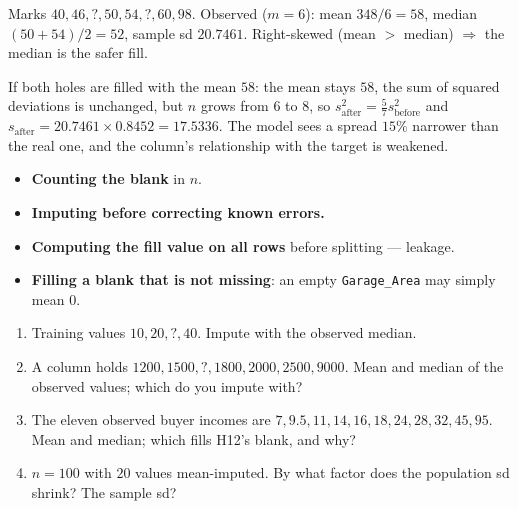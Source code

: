 \documentclass[11pt]{article}
\begin{document}
\begin{worked}
Marks $40, 46, ?, 50, 54, ?, 60, 98$. Observed ($m = 6$): mean $348/6 = 58$,
median $(50 + 54)/2 = 52$, sample sd $20.7461$. Right-skewed (mean $>$
median) $\Rightarrow$ the median is the safer fill.

If both holes are filled with the mean $58$: the mean stays $58$, the sum of
squared deviations is unchanged, but $n$ grows from $6$ to $8$, so
$s^2_{\text{after}} = \tfrac57 s^2_{\text{before}}$ and
$s_{\text{after}} = 20.7461 \times 0.8452 = 17.5336$. The model sees a spread
$15\%$ narrower than the real one, and the column's relationship with the
target is weakened.
\end{worked}

\begin{caution}
\begin{itemize}
  \item \textbf{Counting the blank} in $n$.
  \item \textbf{Imputing before correcting known errors.}
  \item \textbf{Computing the fill value on all rows} before splitting ---
    leakage.
  \item \textbf{Filling a blank that is not missing}: an empty
    \texttt{Garage\_Area} may simply mean $0$.
\end{itemize}
\end{caution}

\begin{tryit}
\begin{enumerate}[label=\textbf{E9.\arabic*}]
  \item Training values $10, 20, ?, 40$. Impute with the observed median.
  \item A column holds $1200, 1500, ?, 1800, 2000, 2500, 9000$. Mean and median
    of the observed values; which do you impute with?
  \item The eleven observed buyer incomes are $7, 9.5, 11, 14, 16, 18, 24, 28,
    32, 45, 95$. Mean and median; which fills H12's blank, and why?
  \item $n = 100$ with $20$ values mean-imputed. By what factor does the
    population sd shrink? The sample sd?
\end{enumerate}
\end{tryit}
\end{document}
